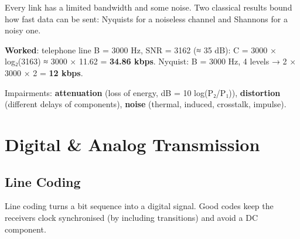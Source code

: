 Every link has a limited bandwidth and some noise. Two classical results bound how fast data can be sent:
Nyquist\textquotesingle s for a noiseless channel and Shannon\textquotesingle s for a noisy one.



\textbf{Worked}: telephone line B = 3000 Hz, SNR = 3162 (≈ 35 dB): C = 3000 × log₂(3163) ≈ 3000 × 11.62 = \textbf{34.86 kbps}.
Nyquist: B = 3000 Hz, 4 levels → 2 × 3000 × 2 = \textbf{12 kbps}.

Impairments: \textbf{attenuation} (loss of energy, dB = 10 log(P₂/P₁)), \textbf{distortion} (different delays of components), \textbf{noise} (thermal, induced, crosstalk, impulse).

\needspace{161pt}

\hypertarget{p2-09--3-digital--analog-transmission}{%
\section{Digital \& Analog Transmission}\label{p2-09--3-digital--analog-transmission}}

\needspace{125pt}

\hypertarget{p2-09--31-line-coding}{%
\subsection{Line Coding}\label{p2-09--31-line-coding}}

Line coding turns a bit sequence into a digital signal. Good codes keep the receiver\textquotesingle s clock synchronised (by
including transitions) and avoid a DC component.



\begingroup\small

